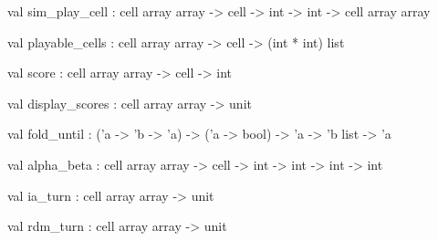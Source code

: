 \documentclass[11pt]{article}
\begin{document}
\label{val:Othello.sim-underscoreplay-underscorecell}\begin{ocamldoccode}
val sim_play_cell :
  cell array array ->
  cell -> int -> int -> cell array array
\end{ocamldoccode}




\label{val:Othello.playable-underscorecells}\begin{ocamldoccode}
val playable_cells : cell array array -> cell -> (int * int) list
\end{ocamldoccode}




\label{val:Othello.score}\begin{ocamldoccode}
val score : cell array array -> cell -> int
\end{ocamldoccode}




\label{val:Othello.display-underscorescores}\begin{ocamldoccode}
val display_scores : cell array array -> unit
\end{ocamldoccode}




\label{val:Othello.fold-underscoreuntil}\begin{ocamldoccode}
val fold_until : ('a -> 'b -> 'a) -> ('a -> bool) -> 'a -> 'b list -> 'a
\end{ocamldoccode}




\label{val:Othello.alpha-underscorebeta}\begin{ocamldoccode}
val alpha_beta : cell array array -> cell -> int -> int -> int -> int
\end{ocamldoccode}




\label{val:Othello.ia-underscoreturn}\begin{ocamldoccode}
val ia_turn : cell array array -> unit
\end{ocamldoccode}




\label{val:Othello.rdm-underscoreturn}\begin{ocamldoccode}
val rdm_turn : cell array array -> unit
\end{ocamldoccode}
\end{document}
